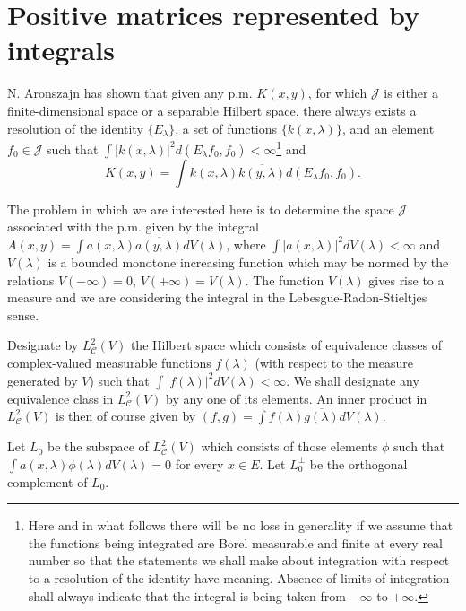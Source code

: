 \documentclass{article}
\begin{document}
\section{Positive matrices represented by integrals}
\label{sec:integral-representation}

N. Aronszajn \cite{aronszajn2} has shown that given any p.m. $K(x, y)$, for which $\mathcal{J}$ is either a finite-dimensional space or a separable Hilbert space, there always exists a resolution of the identity $\{E_\lambda\}$, a set of functions $\{k(x, \lambda)\}$, and an element $f_0 \in \mathcal{J}$ such that $\int |k(x, \lambda)|^2 d(E_\lambda f_0, f_0) < \infty$\footnote{Here and in what follows there will be no loss in generality if we assume that the functions being integrated are Borel measurable and finite at every real number so that the statements we shall make about integration with respect to a resolution of the identity have meaning. Absence of limits of integration shall always indicate that the integral is being taken from $-\infty$ to $+\infty$.} and
\begin{equation}
K(x, y) = \int k(x, \lambda) \overline{k(y, \lambda)} d(E_\lambda f_0, f_0).
\label{eq:aronszajn-representation}
\end{equation}

The problem in which we are interested here is to determine the space $\mathcal{J}$ associated with the p.m. given by the integral $A(x, y) = \int a(x, \lambda) \overline{a(y, \lambda)} dV(\lambda)$, where $\int |a(x, \lambda)|^2 dV(\lambda) < \infty$ and $V(\lambda)$ is a bounded monotone increasing function which may be normed by the relations $V(-\infty) = 0$, $V(+\infty) = V(\lambda)$. The function $V(\lambda)$ gives rise to a measure and we are considering the integral in the Lebesgue-Radon-Stieltjes sense.

Designate by $L^2_\mathcal{C}(V)$ the Hilbert space which consists of equivalence classes of complex-valued measurable functions $f(\lambda)$ (with respect to the measure generated by $V$) such that $\int |f(\lambda)|^2 dV(\lambda) < \infty$. We shall designate any equivalence class in $L^2_\mathcal{C}(V)$ by any one of its elements. An inner product in $L^2_\mathcal{C}(V)$ is then of course given by $(f, g) = \int f(\lambda) \overline{g(\lambda)} dV(\lambda)$.

Let $L_0$ be the subspace of $L^2_\mathcal{C}(V)$ which consists of those elements $\phi$ such that $\int a(x, \lambda) \phi(\lambda) dV(\lambda) = 0$ for every $x \in E$. Let $L_0^{\perp}$ be the orthogonal complement of $L_0$.
\end{document}

